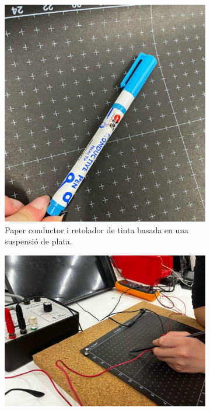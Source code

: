 \documentclass[a4paper,10.5pt]{report}
\begin{document}
\begin{figure}[h]
	\centering
	\begin{subfigure}{0.45\textwidth}
		\centering
		\includegraphics[width=\linewidth]{screenshot002}
		\caption{Paper conductor i retolador de tinta basada en una suspensió de plata.}
		\label{fig1.1a}
	\end{subfigure}
	\hfill
	\begin{subfigure}{0.45\textwidth}
		\centering
		\includegraphics[width=\linewidth]{screenshot003}

\end{subfigure}
\end{figure}
\end{document}
